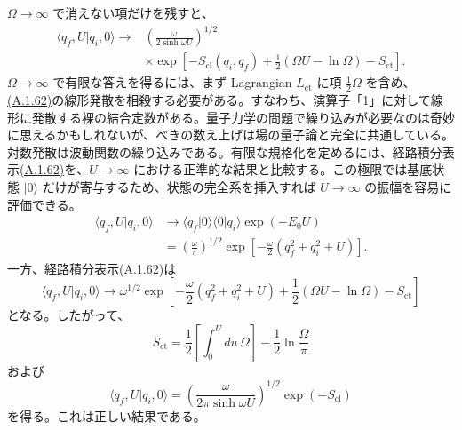 $\Omega\to\infty$ で消えない項だけを残すと、
\begin{equation}
\begin{aligned}
\langle q_f,U|q_i,0\rangle\longrightarrow{}
&\left(\frac{\omega}{2\sinh\omega U}\right)^{1/2}\\
&\times\exp\left[
-S_{\mathrm{cl}}(q_i,q_f)+\frac12(\Omega U-\ln\Omega)-S_{\mathrm{ct}}\right].
\end{aligned}
\tag{A.1.62}\label{eq:A.1.62}
\end{equation}
$\Omega\to\infty$ で有限な答えを得るには、まず Lagrangian $L_{\mathrm{ct}}$ に項 $\tfrac12\Omega$ を含め、\hyperref[eq:A.1.62]{(A.1.62)}の線形発散を相殺する必要がある。すなわち、演算子「1」に対して線形に発散する裸の結合定数がある。量子力学の問題で繰り込みが必要なのは奇妙に思えるかもしれないが、べきの数え上げは場の量子論と完全に共通している。対数発散は波動関数の繰り込みである。有限な規格化を定めるには、経路積分表示\hyperref[eq:A.1.62]{(A.1.62)}を、$U\to\infty$ における正準的な結果と比較する。この極限では基底状態 $\lvert0\rangle$ だけが寄与するため、状態の完全系を挿入すれば $U\to\infty$ の振幅を容易に評価できる。
\begin{equation}
\begin{aligned}
\langle q_f,U|q_i,0\rangle
&\longrightarrow\langle q_f|0\rangle\langle0|q_i\rangle\exp(-E_0U)\\
&=\left(\frac\omega\pi\right)^{1/2}
\exp\left[-\frac\omega2(q_f^2+q_i^2+U)\right].
\end{aligned}
\tag{A.1.63}\label{eq:A.1.63}
\end{equation}
一方、経路積分表示\hyperref[eq:A.1.62]{(A.1.62)}は
\begin{equation}
\langle q_f,U|q_i,0\rangle\longrightarrow
\omega^{1/2}\exp\left[
-\frac\omega2(q_f^2+q_i^2+U)
+\frac12(\Omega U-\ln\Omega)-S_{\mathrm{ct}}\right]
\tag{A.1.64}\label{eq:A.1.64}
\end{equation}
となる。したがって、
\begin{equation}
S_{\mathrm{ct}}
=\frac12\left[\int_0^Udu\,\Omega\right]
-\frac12\ln\frac\Omega\pi
\tag{A.1.65}\label{eq:A.1.65}
\end{equation}
および
\begin{equation}
\langle q_f,U|q_i,0\rangle
=\left(\frac{\omega}{2\pi\sinh\omega U}\right)^{1/2}
\exp(-S_{\mathrm{cl}})
\tag{A.1.66}\label{eq:A.1.66}
\end{equation}
を得る。これは正しい結果である。


